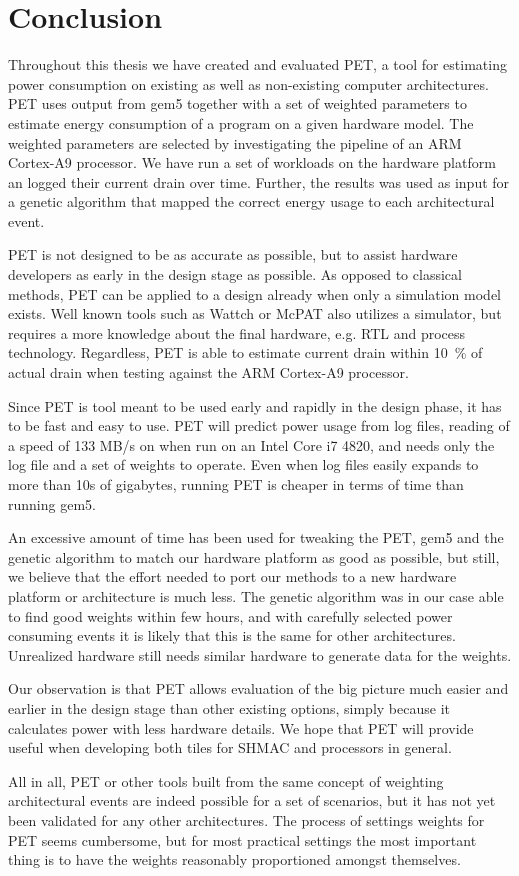 \section{Conclusion}

Throughout this thesis we have created and evaluated PET, a tool for estimating
power consumption on existing as well as non-existing computer architectures.
PET uses output from gem5 together with a set of weighted parameters to estimate
energy consumption of a program on a given hardware model. The weighted
parameters are selected by investigating the pipeline of an ARM Cortex-A9
processor. We have run a set of workloads on the hardware platform an logged
their current drain over time. Further, the results was used as input for a
genetic algorithm that mapped the correct energy usage to each architectural
event.

PET is not designed to be as accurate as possible, but to assist hardware
developers as early in the design stage as possible. As opposed to classical
methods, PET can be applied to a design already when only a simulation model
exists. Well known tools such as Wattch or McPAT also utilizes a simulator, but
requires a more knowledge about the final hardware, e.g. RTL and process
technology. Regardless, PET is able to estimate current drain within 10~\% of
actual drain when testing against the ARM Cortex-A9 processor.

Since PET is tool meant to be used early and rapidly in the design phase, it has
to be fast and easy to use. PET will predict power usage from log files, reading
of a speed of 133 MB/s on when run on an Intel Core i7 4820, and needs only the
log file and a set of weights to operate. Even when log files easily expands to
more than 10s of gigabytes, running PET is cheaper in terms of time than running
gem5.

An excessive amount of time has been used for tweaking the PET, gem5 and the
genetic algorithm to match our hardware platform as good as possible, but still,
we believe that the effort needed to port our methods to a new hardware platform
or architecture is much less.  The genetic algorithm was in our case able to
find good weights within few hours, and with carefully selected power consuming
events it is likely that this is the same for other architectures. Unrealized
hardware still needs similar hardware to generate data for the weights.

Our observation is that PET allows evaluation of the big picture much easier and
earlier in the design stage than other existing options, simply because it
calculates power with less hardware details. We hope that PET will provide
useful when developing both tiles for SHMAC and processors in general.

All in all, PET or other tools built from the same concept of weighting
architectural events are indeed possible for a set of scenarios, but it has not
yet been validated for any other architectures. The process of settings weights
for PET seems cumbersome, but for most practical settings the most important
thing is to have the weights reasonably proportioned amongst themselves.
